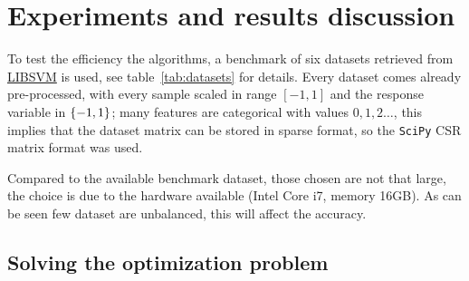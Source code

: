 

\cleardoublepage
\section{Experiments and results discussion}\label{sc:exp}

To test the efficiency the algorithms, a benchmark of six datasets retrieved from \href{https://www.csie.ntu.edu.tw/~cjlin/libsvmtools/datasets/}{LIBSVM} is used, see table~\vref{tab:datasets} for details. Every dataset comes already pre-processed, with every sample scaled in range $[-1,1]$ and the response variable in $\{-1,1\}$; many features are categorical with values $0,1,2\dots$, this implies that the dataset matrix can be stored in sparse format, so the \texttt{SciPy} CSR matrix format was used.

Compared to the available benchmark dataset, those chosen are not that large, the choice is due to the hardware available (Intel\textregistered\xspace Core\texttrademark\xspace i\num{7}, memory \mbox{\num{16}GB}). As can be seen few dataset are unbalanced, this will affect the accuracy.%

\subsection{Solving the optimization problem}

